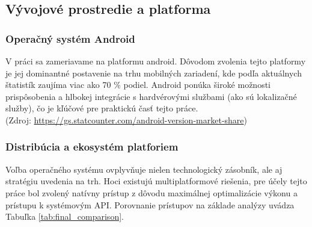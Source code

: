 \subsection{Vývojové prostredie a platforma}

\subsubsection{Operačný systém Android}
V práci sa zameriavame na platformu android. Dôvodom zvolenia tejto platformy je jej dominantné postavenie na trhu mobilných zariadení,
 kde podľa aktuálnych štatistík zaujíma viac ako 70 \% podiel. Android ponúka široké možnosti 
 prispôsobenia a hlbokej integrácie s hardvérovými službami (ako sú lokalizačné služby), čo je kľúčové pre praktickú časť tejto práce.
\\ (Zdroj: \url{https://gs.statcounter.com/android-version-market-share})

\subsubsection{Distribúcia a ekosystém platforiem}
Voľba operačného systému ovplyvňuje nielen technologický zásobník, ale aj stratégiu uvedenia na trh.
Hoci existujú multiplatformové riešenia, pre účely tejto práce bol zvolený natívny prístup z dôvodu maximálnej 
optimalizácie výkonu a prístupu k systémovým API. Porovnanie prístupov na základe analýzy \cite{pullur_medium_2025} uvádza Tabuľka \ref{tab:final_comparison}.

\begin{table}[h!]
\centering
\caption{Súhrnné porovnanie natívneho a multiplatformového vývoja}
\label{tab:final_comparison}
\end{table}

